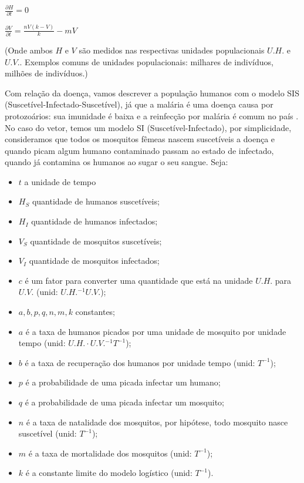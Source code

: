 \documentclass[
	12pt,				%
	openright,			%
	twoside,			%
	a4paper,			%
	english,			%
	french,				%
	spanish,			%
	brazil				%
	]{abntex2}
\begin{document}
$\frac{\partial H}{\partial t} = 0 $ 

$ \frac{\partial V}{\partial t}= \frac{nV(k-V)}{k} -mV$

(Onde ambos $H$ e $V$ são medidos nas respectivas unidades populacionais $U.H.$ e $U.V.$. Exemplos comuns de unidades populacionais: milhares de indivíduos, milhões de indivíduos.)

Com relação da doença, vamos descrever a população humanos com o modelo SIS (Suscetível-Infectado-Suscetível), já que a malária é uma doença causa por protozoários: sua imunidade é baixa e a reinfecção por malária é comum no país \cite{SUS}. No caso do vetor, temos um modelo SI (Suscetível-Infectado), por simplicidade, consideramos que todos os mosquitos fêmeas nascem suscetíveis a doença e quando picam algum humano contaminado passam ao estado de infectado, quando já contamina os humanos ao sugar o seu sangue. Seja:

\begin{itemize}
    \item $t$ a unidade de tempo
    \item $H_S$ quantidade de humanos suscetíveis;
    \item $H_I$ quantidade de humanos infectados;
    \item $V_S$ quantidade de mosquitos suscetíveis;
    \item $V_I$ quantidade de mosquitos infectados;
    \item $c$ é um fator para converter uma quantidade que está na unidade $U.H.$ para $U.V.$ (unid: $U.H.^{-1}U.V.$);
    \item $a,b,p,q,n,m,k$ constantes;
    \item $a$ é a taxa de humanos picados por uma unidade de mosquito por unidade tempo (unid: $U.H.\cdot U.V.^{-1}T^{-1}$);
    \item $b$ é a taxa de recuperação dos humanos por unidade tempo (unid: $T^{-1}$);
    \item $p$ é a probabilidade de uma picada infectar um humano;
    \item $q$ é a probabilidade de uma picada infectar um mosquito;
    \item $n$ é a taxa de natalidade dos mosquitos, por hipótese, todo mosquito nasce suscetível (unid: $T^{-1}$);
    \item $m$ é a taxa de mortalidade dos mosquitos (unid: $T^{-1}$);
    \item $k$ é a constante limite do modelo logístico  (unid: $T^{-1}$). 
\end{itemize}
\end{document}
